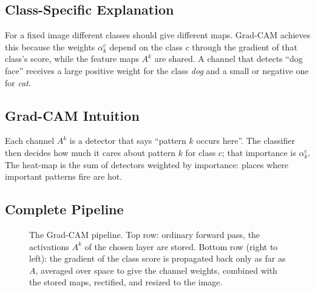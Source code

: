 \documentclass[11pt,a4paper]{article}
\newcommand{\GC}{Grad-CAM}
\begin{document}
\subsection{Class-Specific Explanation}
For a fixed image different classes should give different maps. \GC{} achieves this because the weights $\alpha_k^c$ depend on the class $c$ through the gradient of that class's score, while the feature maps $A^k$ are shared. A channel that detects ``dog face'' receives a large positive weight for the class \emph{dog} and a small or negative one for \emph{cat}.

\subsection{\GC{} Intuition}
Each channel $A^k$ is a detector that says ``pattern $k$ occurs here''. The classifier then decides how much it cares about pattern $k$ for class $c$; that importance is $\alpha_k^c$. The heat-map is the sum of detectors weighted by importance: places where important patterns fire are hot.

\subsection{Complete Pipeline}
\begin{figure}[t]\centering
{}
\caption{The \GC{} pipeline. Top row: ordinary forward pass, the activations $A^k$ of the chosen layer are stored. Bottom row (right to left): the gradient of the class score is propagated back only as far as $A$, averaged over space to give the channel weights, combined with the stored maps, rectified, and resized to the image.}\label{fig:pipeline}
\end{figure}
\end{document}

